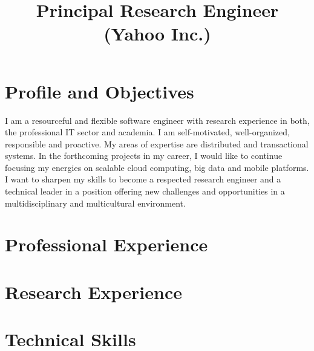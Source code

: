 \documentclass[10pt,letter]{moderncv}
\title{Principal Research Engineer (Yahoo Inc.)}
\begin{document}
\maketitle
\vspace{-1cm}

\section{Profile and Objectives}
\small I am a resourceful and flexible software engineer with research experience in both, the professional IT sector and academia. I am self-motivated, well-organized, responsible and proactive.
My areas of expertise are distributed and transactional systems. In the forthcoming projects in my career, I would like to continue focusing my energies on scalable cloud computing, big data and mobile platforms. I want to sharpen my skills to become a respected research engineer and a technical leader in a position offering new challenges and opportunities in a multidisciplinary and multicultural environment.

\section{Professional Experience}

\section{Research Experience}
\vspace{-0.6cm}

\section{Technical Skills}
\vspace{-0.4cm}
\end{document}
